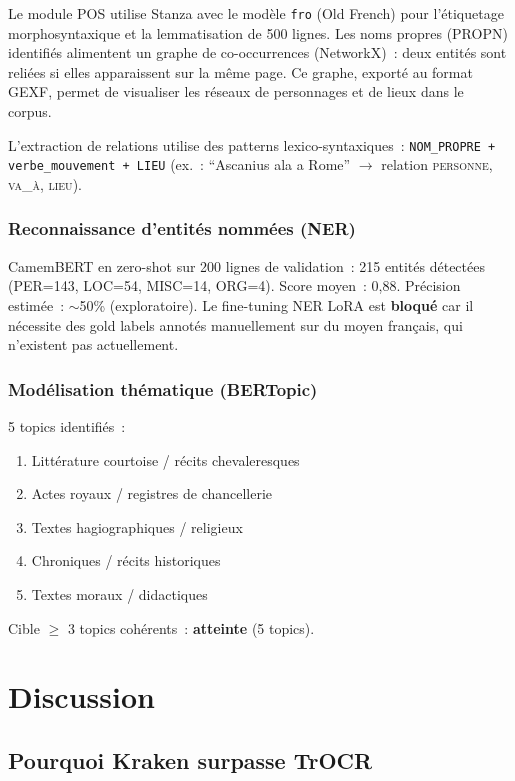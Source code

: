 \documentclass[11pt,a4paper]{article}
\begin{document}
Le module POS utilise Stanza avec le modèle \texttt{fro} (Old French) pour l'étiquetage morphosyntaxique et la lemmatisation de 500 lignes. Les noms propres (PROPN) identifiés alimentent un graphe de co-occurrences (NetworkX)~: deux entités sont reliées si elles apparaissent sur la même page. Ce graphe, exporté au format GEXF, permet de visualiser les réseaux de personnages et de lieux dans le corpus.

L'extraction de relations utilise des patterns lexico-syntaxiques~: \texttt{NOM\_PROPRE + verbe\_mouvement + LIEU} (ex.~: ``Ascanius ala a Rome'' $\rightarrow$ relation \textsc{personne, va\_à, lieu}).

\subsubsection{Reconnaissance d'entités nommées (NER)}

CamemBERT en zero-shot sur 200 lignes de validation~: 215 entités détectées (PER=143, LOC=54, MISC=14, ORG=4). Score moyen~: 0,88. Précision estimée~: $\sim$50\% (exploratoire). Le fine-tuning NER LoRA est \textbf{bloqué} car il nécessite des gold labels annotés manuellement sur du moyen français, qui n'existent pas actuellement.

\subsubsection{Modélisation thématique (BERTopic)}

5 topics identifiés~:
\begin{enumerate}[leftmargin=*, itemsep=1pt]
\item Littérature courtoise / récits chevaleresques
\item Actes royaux / registres de chancellerie
\item Textes hagiographiques / religieux
\item Chroniques / récits historiques
\item Textes moraux / didactiques
\end{enumerate}

Cible $\geq$ 3 topics cohérents~: \textbf{atteinte} (5 topics).

\section{Discussion}

\subsection{Pourquoi Kraken surpasse TrOCR}
\end{document}
